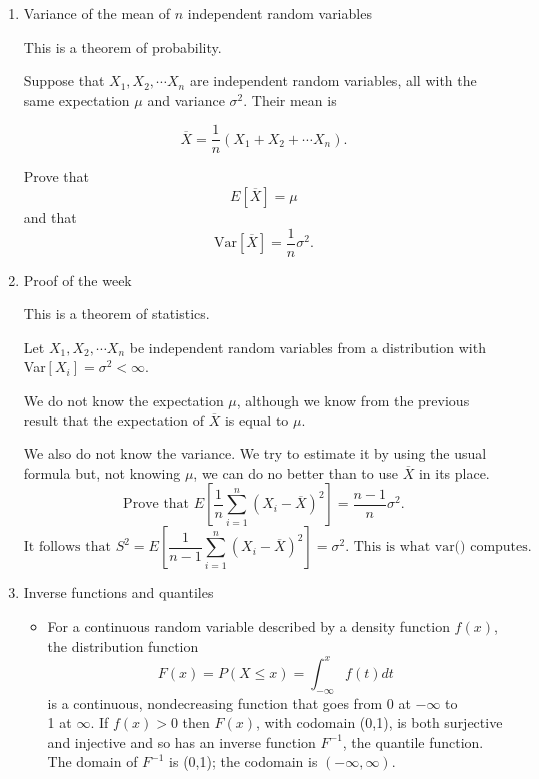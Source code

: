 \documentclass[12pt]{article}
\begin{document}
\begin{enumerate}

\item Variance of the mean of $n$ independent random variables

This is a theorem of probability. 

Suppose that $X_1, X_2, \cdots X_n$ are independent random variables, all with the same expectation $\mu$ and variance $\sigma^2.$ Their mean is

$$\overline{X} = \frac{1}{n}(X_1 + X_2 + \cdots X_n).$$

Prove that $$E[\overline{X}] = \mu$$ and that  $$\text{Var}[\overline{X}] = \frac{1}{n}\sigma^2.$$



\pagebreak


\item Proof of the week

This is a theorem of statistics.

Let $X_1, X_2, \cdots X_n$ be independent random variables from a distribution with Var$[X_i] = \sigma^2 < \infty.$

We do not know the expectation $\mu$, although we know from the previous result that the expectation of $\overline{X}$ is equal to $\mu$.

We also do not know the variance. We try to estimate it by using the usual formula but, not knowing $\mu$, we can do no better than to use $\overline{X}$ in its place.
$$ \text{Prove that }E[\frac{1}{n} \sum_{i=1}^n(X_i - \overline{X})^2] = \frac{n-1}{n}\sigma^2.$$
$$\text{It follows that }S^2 = E[\frac{1}{n-1} \sum_{i=1}^n(X_i - \overline{X})^2] = \sigma^2. \text{ This is what var() computes.}$$

\pagebreak

\item Inverse functions and quantiles

\begin{itemize}

\item For a continuous random variable described by a density function $f(x)$, the distribution function
$$F(x) = P(X \leq x) = \int_{-\infty}^x f(t)dt$$
is a continuous, nondecreasing function that goes from 0 at ${-\infty}$ to\\ 1 at ${\infty}$. If $f(x) > 0$ then $F(x)$, with codomain (0,1), is both surjective and injective and so has an inverse function $F^{-1}$, the quantile function. The domain of $F^{-1}$ is (0,1); the codomain is $(-\infty, \infty)$.


\end{itemize}
\end{enumerate}
\end{document}
